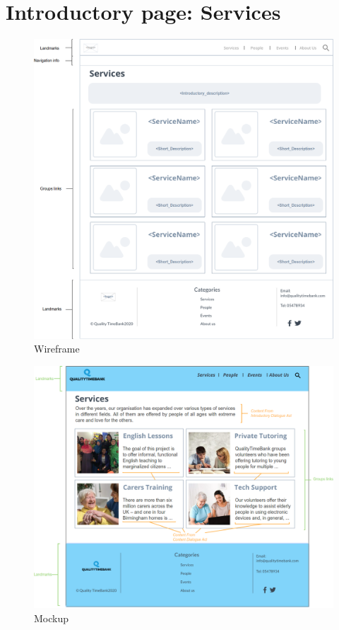 \documentclass[a4paper, 11pt, parskip=half, headsepline]{scrreprt}
\begin{document}
\section{Introductory page: Services}

\begin{figure}[H]
    \centering
    \includegraphics[width=1\linewidth, keepaspectratio]{wireframes/Introductory-Services}
    \caption{Wireframe}
\end{figure}

\begin{figure}[H]
    \centering
    \includegraphics[width=1\linewidth, keepaspectratio]{mockups/ConcreteServices}
    \caption{Mockup}
\end{figure}
\end{document}
